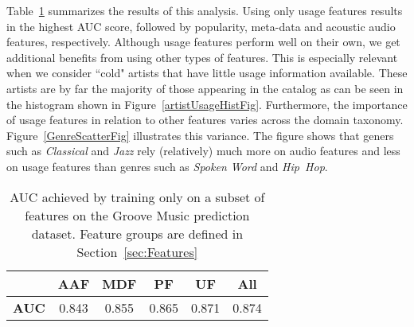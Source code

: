 Table~\ref{tab:features_AUC} summarizes the  results of this analysis. Using only usage features results in the highest AUC score, followed by popularity, meta-data and acoustic audio features, respectively. Although usage features perform well on their own, we get additional benefits from using other types of features. This is especially relevant when we consider ``cold" artists that have little usage information available. These artists are by far the majority of those appearing in the catalog as can be seen in the histogram shown in Figure~\ref{artistUsageHistFig}.  Furthermore, the importance of usage features in relation to other features varies across the domain taxonomy. Figure~\ref{GenreScatterFig} illustrates this variance. The figure shows that geners such as \textit{Classical} and \textit{Jazz} rely (relatively) much more on audio features and less on usage features than genres such as \textit{Spoken Word} and \textit{Hip~Hop}.


\begin{table}[h!]
\begin{center}
	\begin{tabular}{|c|c|c|c|c|c|}
		\hline
		 & {\bf AAF} & {\bf MDF} & {\bf PF} & {\bf UF} & {\bf All}\\ 
		\hline
		 {\bf AUC} & 0.843  & 0.855 & 0.865 & 0.871 & 0.874\\ 
		\hline
	\end{tabular}
	\vspace{-0.4cm}
\end{center}
\caption{AUC achieved by training only on a subset of features on the Groove Music prediction dataset. Feature groups are defined in Section~\ref{sec:Features}}
\label{tab:features_AUC}
\end{table}











